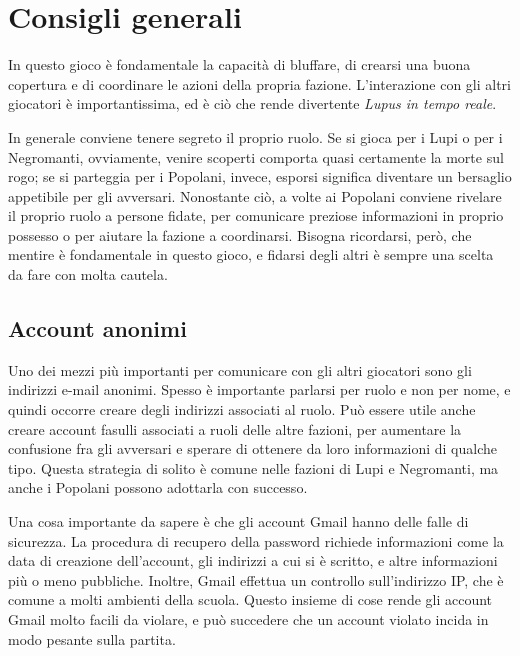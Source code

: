 \documentclass[a4paper,10pt]{article}
\begin{document}
\section{Consigli generali}

In questo gioco è fondamentale la capacità di bluffare, di crearsi una buona copertura e di coordinare le azioni della propria fazione. L'interazione con gli altri giocatori è importantissima, ed è ciò che rende divertente \emph{Lupus in tempo reale}.

In generale conviene tenere segreto il proprio ruolo. Se si gioca per i Lupi o per i Negromanti, ovviamente, venire scoperti comporta quasi certamente la morte sul rogo; se si parteggia per i Popolani, invece, esporsi significa diventare un bersaglio appetibile per gli avversari. Nonostante ciò, a volte ai Popolani conviene rivelare il proprio ruolo a persone fidate, per comunicare preziose informazioni in proprio possesso o per aiutare la fazione a coordinarsi. Bisogna ricordarsi, però, che mentire è fondamentale in questo gioco, e fidarsi degli altri è sempre una scelta da fare con molta cautela.

\subsection{Account anonimi}

Uno dei mezzi più importanti per comunicare con gli altri giocatori sono gli indirizzi e-mail anonimi. Spesso è importante parlarsi per ruolo e non per nome, e quindi occorre creare degli indirizzi associati al ruolo. Può essere utile anche creare account fasulli associati a ruoli delle altre fazioni, per aumentare la confusione fra gli avversari e sperare di ottenere da loro informazioni di qualche tipo. Questa strategia di solito è comune nelle fazioni di Lupi e Negromanti, ma anche i Popolani possono adottarla con successo.

Una cosa importante da sapere è che gli account Gmail hanno delle falle di sicurezza. La procedura di recupero della password richiede informazioni come la data di creazione dell'account, gli indirizzi a cui si è scritto, e altre informazioni più o meno pubbliche. Inoltre, Gmail effettua un controllo sull'indirizzo IP, che è comune a molti ambienti della scuola. Questo insieme di cose rende gli account Gmail molto facili da violare, e può succedere che un account violato incida in modo pesante sulla partita.
\end{document}

